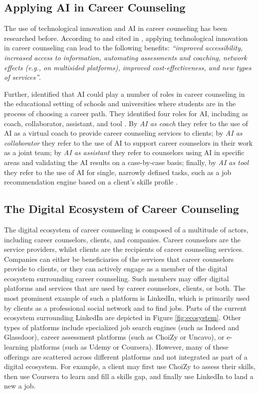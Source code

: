 \subsection{Applying AI in Career Counseling}

The use of technological innovation and AI in career counseling has been researched before. According to
\cite{westmanArtificialIntelligenceCareer2021} and cited in \cite{kaserAIpoweredCareerCounseling2023}, applying
technological innovation in career counseling can lead to the following benefits: \textit{``improved accessibility,
increased access to information, automating assessments and coaching, network effects (e.g., on multisided platforms),
improved cost-effectiveness, and new types of services''}.

Further, \cite{westmanArtificialIntelligenceCareer2021} identified that AI could play a number of roles in career
counseling in the educational setting of schools and universities where students are in the process of choosing a career
path. They identified four roles for AI, including as coach, collaborator, assistant, and tool \citep{westmanArtificialIntelligenceCareer2021}.
By \textit{AI as coach} they refer to the use of AI as a virtual coach to provide career counseling services to clients; by
\textit{AI as collaborator} they refer to the use of AI to support career counselors in their work as a joint team; by
\textit{AI as assistant} they refer to counselors using AI in specific areas and validating the AI results on a case-by-case
basis; finally, by \textit{AI as tool} they refer to the use of AI for single, narrowly defined tasks, such as a job recommendation
engine based on a client's skills profile \citep{westmanArtificialIntelligenceCareer2021}.

\subsection{The Digital Ecosystem of Career Counseling}

The digital ecosystem of career counseling is composed of a multitude of actors, including career counselors, clients,
and companies. Career counselors are the service providers, whilst clients are the recipients of career counseling services.
Companies can either be beneficiaries of the services that career counselors provide to clients, or they can actively engage
as a member of the digital ecosystem surrounding career counseling. Such members may offer digital platforms and services
that are used by career counselors, clients, or both. The most prominent example of such a platform is LinkedIn, which
is primarily used by clients as a professional social network and to find jobs. Parts of the current ecosystem surrounding
LinkedIn are depicted in Figure \ref{fig:ecosystem}. Other types of platforms include specialized job search engines (such as
Indeed and Glassdoor), career assessment platforms (such as ChoiZy or Uncavo), or e-learning platforms (such as Udemy or Coursera).
However, many of these offerings are scattered across different platforms and not integrated as part of a digital ecosystem. For
example, a client may first use ChoiZy to assess their skills, then use Coursera to learn and fill a skills gap, and finally use
LinkedIn to land a new a job.

